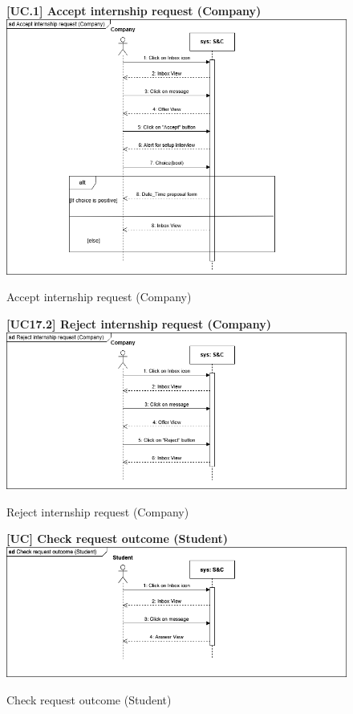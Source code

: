 \begin{figure}[H]
\textbf{[UC\nextUCDiagr.1] Accept internship request (Company)}\newline\newline
\includegraphics[width=15cm]{Images/UC_diagram/RASD-UC15.drawio.png}
    \caption{Accept internship request (Company)}
\end{figure}

\begin{figure}[H]
\textbf{[UC17.2] Reject internship request (Company)}\newline\newline
\includegraphics[width=15cm]{Images/UC_diagram/RASD-UC17.drawio.png}
    \caption{Reject internship request (Company)}
\end{figure}

\begin{figure}[H]
\textbf{[UC\nextUCDiagr] Check request outcome (Student)}\newline\newline
\includegraphics[width=15cm]{Images/UC_diagram/RASD-UC_CheckRequestOutcome(S).png}
    \caption{Check request outcome (Student)}
\end{figure}


